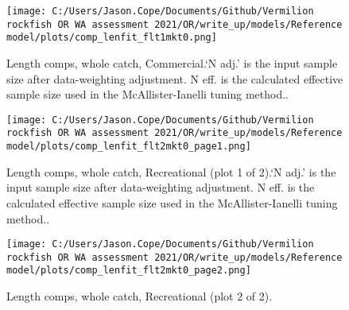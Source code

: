 \documentclass[11pt,
  english,
  a4paper,
]{article}
\begin{document}
\leavevmode\tagmcend\tagstructend


\begin{figure}
\centering
\texttt{[image: C:/Users/Jason.Cope/Documents/Github/Vermilion rockfish OR WA assessment 2021/OR/write\_up/models/Reference model/plots/comp\_lenfit\_flt1mkt0.png]}
\caption{Length comps, whole catch, Commercial.`N adj.' is the input sample size after data-weighting adjustment. N eff. is the calculated effective sample size used in the McAllister-Ianelli tuning method..\label{fig:comp_lenfit_flt1mkt0}}
\end{figure}

\tagmcend\tagstructend


\begin{figure}
\centering
\texttt{[image: C:/Users/Jason.Cope/Documents/Github/Vermilion rockfish OR WA assessment 2021/OR/write\_up/models/Reference model/plots/comp\_lenfit\_flt2mkt0\_page1.png]}
\caption{Length comps, whole catch, Recreational (plot 1 of 2).`N adj.' is the input sample size after data-weighting adjustment. N eff. is the calculated effective sample size used in the McAllister-Ianelli tuning method..\label{fig:comp_lenfit_flt2mkt0_page1}}
\end{figure}

\tagmcend\tagstructend


\begin{figure}
\centering
\texttt{[image: C:/Users/Jason.Cope/Documents/Github/Vermilion rockfish OR WA assessment 2021/OR/write\_up/models/Reference model/plots/comp\_lenfit\_flt2mkt0\_page2.png]}
\caption{Length comps, whole catch, Recreational (plot 2 of 2).\label{fig:comp_lenfit_flt2mkt0_page2}}
\end{figure}
\end{document}
